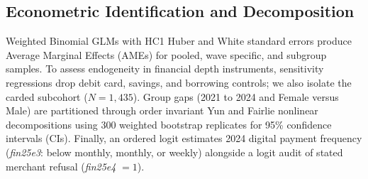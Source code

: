 \documentclass[conference]{IEEEtran}
\begin{document}
\subsection{Econometric Identification and Decomposition}
Weighted Binomial GLMs with HC1 Huber and White standard errors produce Average Marginal Effects (AMEs) for pooled, wave specific, and subgroup samples. To assess endogeneity in financial depth instruments, sensitivity regressions drop debit card, savings, and borrowing controls; we also isolate the carded subcohort ($N = 1,435$). Group gaps (2021 to 2024 and Female versus Male) are partitioned through order invariant Yun and Fairlie nonlinear decompositions \cite{fairlie2005, yun2004} using 300 weighted bootstrap replicates for 95\% confidence intervals (CIs). Finally, an ordered logit estimates 2024 digital payment frequency (\textit{fin25e3}: below monthly, monthly, or weekly) alongside a logit audit of stated merchant refusal (\textit{fin25e4} $= 1$).
\end{document}
